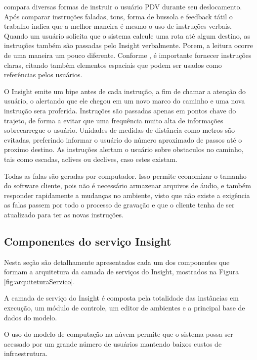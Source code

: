 \documentclass[english,brazilian]{UNISINOSmonografia}
\begin{document}
 compara diversas formas de instruir o usuário PDV durante seu deslocamento. Após comparar instruções faladas, tons, forma de bussola e feedback tátil o trabalho indica que a melhor maneira é mesmo o uso de instruções verbais. Quando um usuário solicita que o sistema calcule uma rota até algum destino, as instruções também são passadas pelo Insight verbalmente. Porem, a leitura ocorre de uma maneira um pouco diferente. Conforme , é importante fornecer instruções claras, citando também elementos espaciais que podem ser usados como referências pelos usuários.

O Insight emite um bipe antes de cada instrução, a fim de chamar a atenção do usuário, o alertando que ele chegou em um novo marco do caminho e uma nova instrução sera proferida. Instruções são passadas apenas em pontos chave do trajeto, de forma a evitar que uma frequência muito alta de informações sobrecarregue o usuário. Unidades de medidas de distância como metros são evitadas, preferindo informar o usuário do número aproximado de passos até o proximo destino. As instruções alertam o usuário sobre obstaculos no caminho, tais como escadas, aclives ou declives, caso estes existam.

Todas as falas são geradas por computador. Isso permite economizar o tamanho do software cliente, pois não é necessário armazenar arquivos de áudio, e também responder rapidamente a mudanças no ambiente, visto que não existe a exigência as falas passem por todo o processo de gravação e que o cliente tenha de ser atualizado para ter as novas instruções.	














	\subsection{Componentes do serviço Insight}
Nesta seção são detalhamente apresentados cada um dos componentes que formam a arquitetura da camada de serviços do Insight, mostrados na Figura \ref{fig:arquiteturaServico}.

A camada de serviço do Insight é composta pela totalidade das instâncias em execução, um módulo de controle, um editor de ambientes e a principal base de dados do modelo. 

O uso do modelo de computação na núvem permite que o sistema possa ser acessado por um grande número de usuários mantendo baixos custos de infraestrutura.
\end{document}
